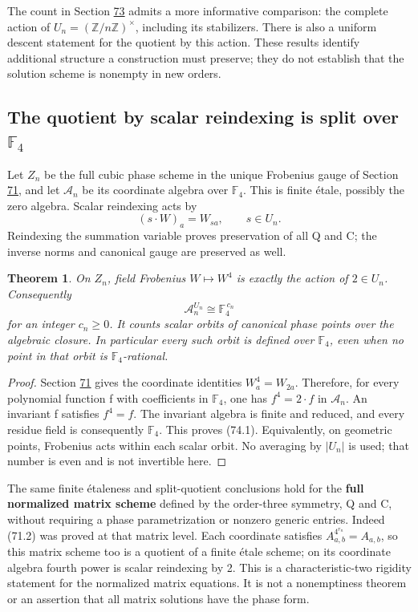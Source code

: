 \documentclass[11pt,reqno]{amsart}
\theoremstyle{plain}
\newtheorem{theorem}{Theorem}[section]
\begin{document}
The count in Section \hyperref[sec:73]{73} admits a more informative comparison: the complete
action of \(U_n=(\mathbb Z/n\mathbb Z)^\times\), including its stabilizers.
There is also a uniform descent statement for the quotient by this action.
These results identify additional structure a construction must preserve;
they do not establish that the solution scheme is nonempty in new orders.

\subsection{\texorpdfstring{The quotient by scalar reindexing is split over \(\mathbb F_4\)}{The quotient by scalar reindexing is split over F4}}\label{sec:74.1}

Let \(Z_n\) be the full cubic phase scheme in the unique Frobenius gauge
of Section \hyperref[sec:71]{71}, and let \(\mathcal A_n\) be its coordinate algebra over
\(\mathbb F_4\). This is finite \'etale, possibly the zero algebra. Scalar
reindexing acts by
\[
 (s\cdot W)_a=W_{sa},\qquad s\in U_n.
\]
Reindexing the summation variable proves preservation of all Q and C;
the inverse norms and canonical gauge are preserved as well.

\begin{theorem}
On \(Z_n\), field Frobenius \(W\mapsto W^4\) is exactly
the action of \(2\in U_n\). Consequently
\begin{equation*}
 \boxed{\mathcal A_n^{U_n}\cong\mathbb F_4^{\,c_n}}
 \tag{74.1}
\end{equation*}
for an integer \(c_n\ge0\). It counts scalar orbits of canonical phase
points over the algebraic closure. In particular every such orbit is
defined over \(\mathbb F_4\), even when no point in that orbit is
\(\mathbb F_4\)-rational.
\end{theorem}

\begin{proof}
Section \hyperref[sec:71]{71} gives the coordinate identities
\(W_a^4=W_{2a}\). Therefore, for every polynomial function f with
coefficients in \(\mathbb F_4\), one has \(f^4=2\cdot f\) in
\(\mathcal A_n\). An invariant f satisfies \(f^4=f\). The invariant
algebra is finite and reduced, and every residue field is consequently
\(\mathbb F_4\). This proves (74.1). Equivalently, on geometric points,
Frobenius acts within each scalar orbit. No averaging by \(|U_n|\) is
used; that number is even and is not invertible here.
\end{proof}

The same finite \'etaleness and split-quotient conclusions hold for the
\textbf{full normalized matrix scheme} defined by the order-three symmetry,
Q and C, without requiring a phase parametrization or nonzero generic
entries. Indeed (71.2) was proved at that matrix level. Each coordinate
satisfies \(A_{a,b}^{4^{r_n}}=A_{a,b}\), so this matrix scheme too is a
quotient of a finite \'etale scheme; on its coordinate algebra fourth
power is scalar reindexing by 2. This is a characteristic-two rigidity
statement for the normalized matrix equations. It is not a
nonemptiness theorem or an assertion that all matrix solutions have
the phase form.
\end{document}
